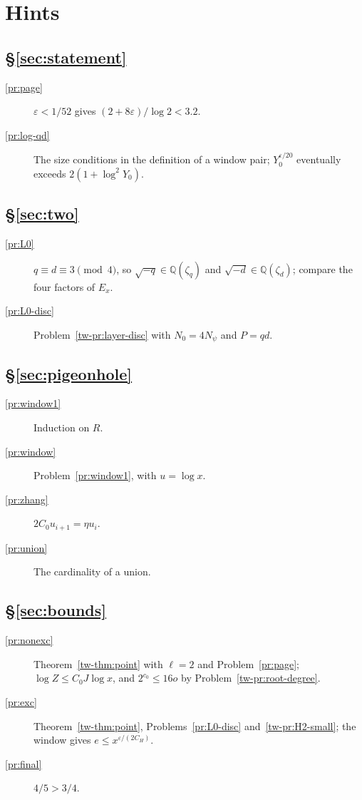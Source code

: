 \documentclass[reqno]{amsart}
\theoremstyle{definition}
\theoremstyle{plain}
\theoremstyle{remark}
\newcommand{\Q}{\mathbb{Q}}
\begin{document}
\section*{Hints}

\subsection*{\S\ref{sec:statement}}
\begin{description}
\item[\ref{pr:page}] \(\varepsilon<1/52\) gives \((2+8\varepsilon)/\log2<3.2\).
\item[\ref{pr:log-qd}] The size conditions in the definition of a window pair; \(Y_0^{\varepsilon/20}\) eventually exceeds \(2(1+\log^2Y_0)\).
\end{description}

\subsection*{\S\ref{sec:two}}
\begin{description}
\item[\ref{pr:L0}] \(q\equiv d\equiv3\pmod4\), so \(\sqrt{-q}\in\Q(\zeta_q)\) and \(\sqrt{-d}\in\Q(\zeta_d)\); compare the four factors of \(E_x\).
\item[\ref{pr:L0-disc}] Problem~\ref{tw-pr:layer-disc} with \(N_0=4N_\psi\) and \(P=qd\).
\end{description}

\subsection*{\S\ref{sec:pigeonhole}}
\begin{description}
\item[\ref{pr:window1}] Induction on \(R\).
\item[\ref{pr:window}] Problem~\ref{pr:window1}, with \(u=\log x\).
\item[\ref{pr:zhang}] \(2C_0u_{i+1}=\eta u_i\).
\item[\ref{pr:union}] The cardinality of a union.
\end{description}

\subsection*{\S\ref{sec:bounds}}
\begin{description}
\item[\ref{pr:nonexc}] Theorem~\ref{tw-thm:point} with \(\ell=2\) and Problem~\ref{pr:page}; \(\log Z\le C_0J\log x\), and \(2^{c_0}\le16o\) by Problem~\ref{tw-pr:root-degree}.
\item[\ref{pr:exc}] Theorem~\ref{tw-thm:point}, Problems~\ref{pr:L0-disc} and~\ref{tw-pr:H2-small}; the window gives \(e\le x^{\varepsilon/(2C_H)}\).
\item[\ref{pr:final}] \(4/5>3/4\).
\end{description}
\end{document}
